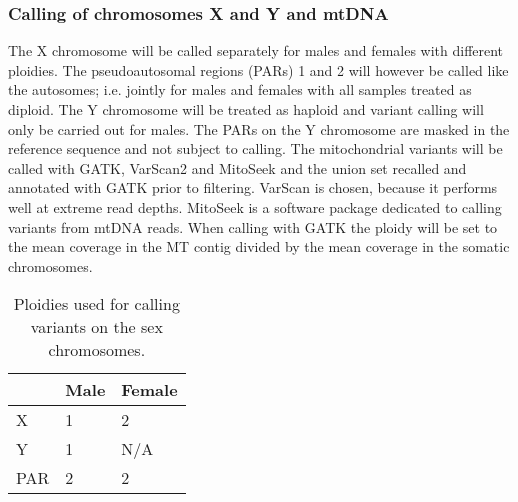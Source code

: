 \subsubsection{Calling of chromosomes X and Y and mtDNA}
The X chromosome will be called separately for males and females with different ploidies. The pseudoautosomal regions (PARs) 1 and 2 will however be called like the autosomes; i.e. jointly for males and females with all samples treated as diploid. The Y chromosome will be treated as haploid and variant calling will only be carried out for males. The PARs on the Y chromosome are masked in the reference sequence and not subject to calling. The mitochondrial variants will be called with GATK, VarScan2\cite{Koboldt2012} and MitoSeek and the union set recalled and annotated with GATK prior to filtering. VarScan is chosen, because it performs well at extreme read depths.\cite{Stead2013} MitoSeek is a software package dedicated to calling variants from mtDNA reads. When calling with GATK the ploidy will be set to the mean coverage in the MT contig divided by the mean coverage in the somatic chromosomes.

\begin{table}[h]
\centering
\begin{tabular}{l|l|l|}
\cline{2-3}
\rowcolor[HTML]{FFFFFF} 
                          & Male & Female \\ \hline
\multicolumn{1}{|l|}{X}   & 1    & 2      \\ \hline
\multicolumn{1}{|l|}{Y}   & 1    & N/A    \\ \hline
\multicolumn{1}{|l|}{PAR} & 2    & 2      \\ \hline 
\end{tabular}
\caption{Ploidies used for calling variants on the sex chromosomes.}
\label{table:XYcalling}
\end{table}


